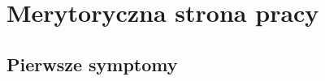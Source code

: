 \chapter{Merytoryczna strona pracy}

\section{Pierwsze symptomy}
\label{sec:pierwsze_symptomy}
\lipsum[2-4]
